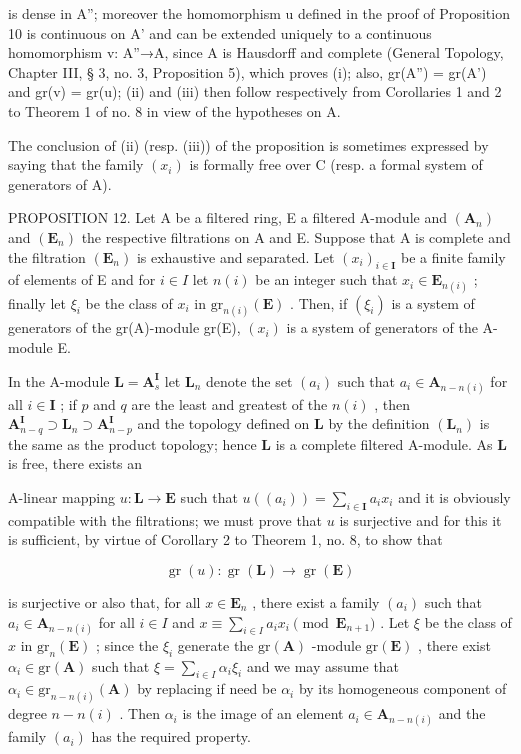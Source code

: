 is dense in A''; moreover the homomorphism u defined in the proof of Proposition 10 is continuous on A' and can be extended uniquely to a continuous homomorphism v: A''→A, since A is Hausdorff and complete (General Topology, Chapter III, § 3, no. 3, Proposition 5), which proves (i); also, gr(A'') = gr(A') and gr(v) = gr(u); (ii) and (iii) then follow respectively from Corollaries 1 and 2 to Theorem 1 of no. 8 in view of the hypotheses on A.

The conclusion of (ii) (resp. (iii)) of the proposition is sometimes expressed by saying that the family \((x_{i})\) is formally free over C (resp. a formal system of generators of A).

PROPOSITION 12. Let A be a filtered ring, E a filtered A-module and \((\mathbf{A}_{n})\) and \((\mathbf{E}_{n})\) the respective filtrations on A and E. Suppose that A is complete and the filtration \((\mathbf{E}_{n})\) is exhaustive and separated. Let \((x_{i})_{i\in\mathbf{I}}\) be a finite family of elements of E and for \(i\in I\) let \(n(i)\) be an integer such that \(x_{i}\in\mathbf{E}_{n(i)}\) ; finally let \(\xi_{i}\) be the class of \(x_{i}\) in \(\mathrm{gr}_{n(i)}(\mathbf{E})\) . Then, if \((\xi_{i})\) is a system of generators of the gr(A)-module gr(E), \((x_{i})\) is a system of generators of the A-module E.

In the A-module \(\mathbf{L} = \mathbf{A}_s^{\mathbf{I}}\) let \(\mathbf{L}_n\) denote the set \((a_i)\) such that \(a_i \in \mathbf{A}_{n - n(i)}\) for all \(i \in \mathbf{I}\) ; if \(p\) and \(q\) are the least and greatest of the \(n(i)\) , then \(\mathbf{A}_{n - q}^{\mathbf{I}} \supset \mathbf{L}_n \supset \mathbf{A}_{n - p}^{\mathbf{I}}\) and the topology defined on \(\mathbf{L}\) by the definition \((\mathbf{L}_n)\) is the same as the product topology; hence \(\mathbf{L}\) is a complete filtered A-module. As \(\mathbf{L}\) is free, there exists an

A-linear mapping \(u: \mathbf{L} \to \mathbf{E}\) such that \(u((a_i)) = \sum_{i \in \mathbf{I}} a_i x_i\) and it is obviously compatible with the filtrations; we must prove that \(u\) is surjective and for this it is sufficient, by virtue of Corollary 2 to Theorem 1, no. 8, to show that

\[
\operatorname{gr} (u): \operatorname{gr} (\mathbf {L}) \rightarrow \operatorname{gr} (\mathbf {E})
\]

is surjective or also that, for all \(x \in \mathbf{E}_n\) , there exist a family \((a_i)\) such that \(a_i \in \mathbf{A}_{n-n(i)}\) for all \(i \in I\) and \(x \equiv \sum_{i \in I} a_i x_i \pmod{\mathbf{E}_{n+1}}\) . Let \(\xi\) be the class of \(x\) in \(\mathrm{gr}_n(\mathbf{E})\) ; since the \(\xi_i\) generate the \(\mathrm{gr}(\mathbf{A})\) -module \(\mathrm{gr}(\mathbf{E})\) , there exist \(\alpha_i \in \mathrm{gr}(\mathbf{A})\) such that \(\xi = \sum_{i \in I} \alpha_i \xi_i\) and we may assume that \(\alpha_i \in \mathrm{gr}_{n-n(i)}(\mathbf{A})\) by replacing if need be \(\alpha_i\) by its homogeneous component of degree \(n - n(i)\) . Then \(\alpha_i\) is the image of an element \(a_i \in \mathbf{A}_{n-n(i)}\) and the family \((a_i)\) has the required property.

